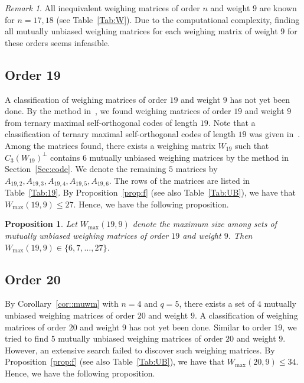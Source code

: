 \documentclass[12pt]{article}
\newtheorem{prop}[thm]{Proposition}
\theoremstyle{remark}
\newtheorem{rem}[thm]{Remark}
\begin{document}
\begin{rem}
All inequivalent weighing matrices of order $n$ and weight $9$ are known
for $n=17,18$ (see Table~\ref{Tab:W}).
Due to the computational complexity,
finding all mutually
unbiased weighing matrices for each weighing matrix of weight $9$ for these orders seems infeasible. 
\end{rem}


\subsection{Order 19}

A classification of weighing matrices of order $19$ and weight $9$ has not yet been done.
By the method in~\cite{HM}, we found weighing matrices of
order $19$ and weight $9$ from ternary maximal self-orthogonal codes of length $19$.
Note that a classification of ternary maximal self-orthogonal codes of length $19$
was given in~\cite{PSW}.
Among the matrices found, there exists a weighing matrix $W_{19}$ 
such that 
$C_3(W_{19})^\perp$ contains $6$ mutually unbiased weighing matrices
by the method in Section~\ref{Sec:code}.
We denote the remaining $5$ matrices by
$A_{19,2},A_{19,3},A_{19,4},A_{19,5},A_{19,6}$.
The rows of the matrices are listed in Table~\ref{Tab:19}.
By Proposition~\ref{prop:f} (see also Table~\ref{Tab:UB}), 
we have that $W_{\max}(19,9) \le 27$.
Hence, we have the following proposition.


\begin{prop}\label{prop:19}
Let $W_{\max}(19,9)$ denote 
the maximum size among sets of mutually
unbiased weighing matrices of order $19$ and weight $9$.
Then
$W_{\max}(19,9) \in \{6,7,\ldots,27\}$.
\end{prop}

\subsection{Order 20}

By Corollary~\ref{cor::muwm} with $n=4$ and $q=5$, there exists a set of $4$ mutually unbiased weighing matrices 
of order $20$ and weight $9$.
A classification of weighing matrices of order $20$ and weight $9$ has not yet been done.
Similar to order $19$, we tried to find $5$ mutually unbiased weighing matrices 
of order $20$ and weight $9$.
However, an extensive search failed to discover such weighing matrices.
By Proposition~\ref{prop:f} (see also Table~\ref{Tab:UB}), 
we have that $W_{\max}(20,9) \le 34$.
Hence, we have the following proposition.
\end{document}
